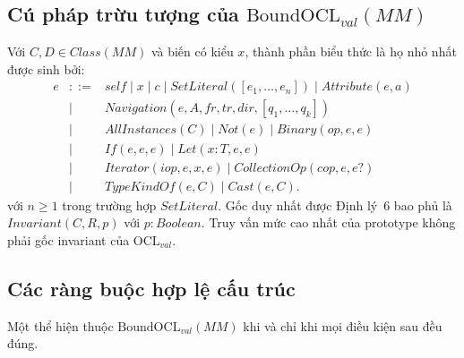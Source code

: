 \documentclass[11pt,a4paper]{article}
\theoremstyle{definition}
\newcommand{\OCLval}{\mathrm{OCL}_{val}}
\newcommand{\BoundOCLval}{\mathrm{BoundOCL}_{val}}
\begin{document}
\subsection{Cú pháp trừu tượng của $\BoundOCLval(MM)$}

Với $C,D\in Class(MM)$ và biến có kiểu $x$, thành phần biểu thức là họ nhỏ nhất
được sinh bởi:
\[
\begin{array}{rcl}
e &::=& self \mid x \mid c \mid SetLiteral([e_1,\ldots,e_n]) \mid Attribute(e,a)\\
  &\mid& Navigation(e,A,fr,tr,dir,[q_1,\ldots,q_k])\\
  &\mid& AllInstances(C) \mid Not(e) \mid Binary(op,e,e)\\
  &\mid& If(e,e,e) \mid Let(x:T,e,e)\\
  &\mid& Iterator(iop,e,x,e) \mid CollectionOp(cop,e,e?)\\
  &\mid& TypeKindOf(e,C) \mid Cast(e,C).
\end{array}
\]
với $n\geq 1$ trong trường hợp $SetLiteral$.
Gốc duy nhất được Định lý~6 bao phủ là $Invariant(C,R,p)$ với $p:Boolean$.
Truy vấn mức cao nhất của prototype không phải gốc invariant của $\OCLval$.

\subsection{Các ràng buộc hợp lệ cấu trúc}

Một thể hiện thuộc $\BoundOCLval(MM)$ khi và chỉ khi mọi điều kiện sau đều đúng.
\end{document}
